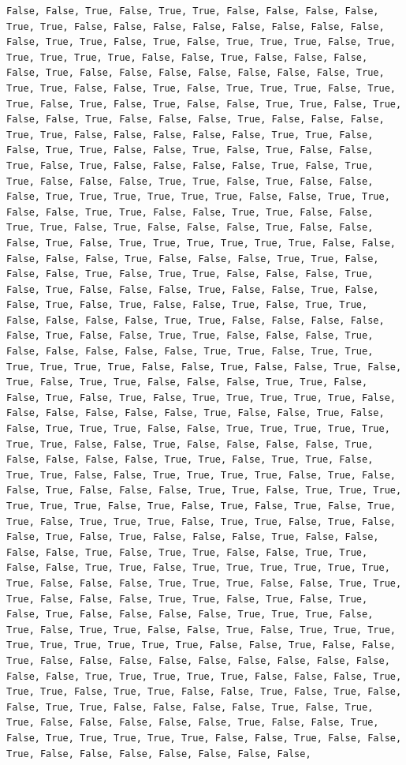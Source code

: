 \documentclass[
  letterpaper,
  DIV=11,
  numbers=noendperiod]{scrartcl}
\begin{document}
\begin{verbatim}
False, False, True, False, True, True, False, False, False, False, True, True, False, False, False, False, False, False, False, False, False, True, True, False, True, False, True, True, True, False, True, True, True, True, True, False, False, True, False, False, False, False, True, False, False, False, False, False, False, False, True, True, True, False, False, True, False, True, True, True, False, True, True, False, True, False, True, False, False, True, True, False, True, False, False, True, False, False, False, True, False, False, False, True, True, False, False, False, False, False, True, True, False, False, True, True, False, False, True, False, True, False, False, True, False, True, False, False, False, False, True, False, True, True, False, False, False, True, True, False, True, False, False, False, True, True, True, True, True, True, False, False, True, True, False, False, True, True, False, False, True, True, False, False, True, True, False, True, False, False, False, True, False, False, False, True, False, True, True, True, True, True, True, False, False, False, False, False, True, False, False, False, True, True, False, False, False, True, False, True, True, False, False, False, True, False, True, False, False, False, True, False, False, True, False, False, True, False, True, False, False, True, False, True, True, False, False, False, False, True, True, False, False, False, False, False, True, False, False, True, True, False, False, False, True, False, False, False, False, False, True, True, False, True, True, True, True, True, True, False, False, True, False, False, True, False, True, False, True, True, False, False, False, True, True, False, False, True, False, True, False, True, True, True, True, True, False, False, False, False, False, False, True, False, False, True, False, False, True, True, True, False, False, True, True, True, True, True, True, True, False, False, True, False, False, False, False, True, False, False, False, False, True, True, False, True, True, False, True, True, False, False, True, True, True, True, False, True, False, False, True, False, False, False, True, True, False, True, True, True, True, True, True, False, True, False, True, False, True, False, True, True, False, True, True, True, False, True, True, False, True, False, False, True, False, True, False, False, False, True, False, False, False, False, True, False, True, True, False, False, True, True, False, False, True, True, False, True, True, True, True, True, True, True, False, False, False, True, True, True, False, False, True, True, True, False, False, False, True, True, False, True, False, True, False, True, False, False, False, False, True, True, True, False, True, False, True, True, False, False, True, False, True, True, True, True, True, True, True, True, True, False, False, True, False, False, True, False, False, False, False, False, False, False, False, False, False, False, True, True, True, True, True, False, False, False, True, True, True, False, True, True, False, False, True, False, True, False, False, True, True, False, False, False, False, True, False, True, True, False, False, False, False, False, True, False, False, True, False, True, True, True, True, True, False, False, True, False, False, True, False, False, False, False, False, False, False, 
\end{verbatim}
\end{document}
